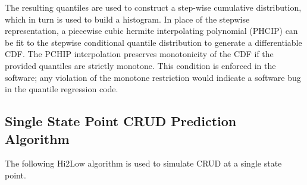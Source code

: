 The resulting quantiles are used to construct a step-wise cumulative distribution, which in turn is used to build a histogram.  In place of the stepwise representation, a piecewise cubic hermite interpolating polynomial (PHCIP) can be fit to the stepwise conditional quantile distribution to generate a differentiable CDF.
The PCHIP interpolation preserves monotonicity of the CDF if the provided quantiles are strictly monotone.  This condition is enforced in the software; any violation of the monotone restriction would indicate a software bug in the quantile regression code.

\subsection{Single State Point CRUD Prediction Algorithm}

The following Hi2Low algorithm is used to simulate CRUD at a single state point.


